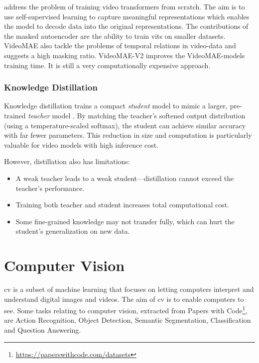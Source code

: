 \textcite{tong_videomae_2022} address the problem of training video transformers from scratch. The aim is to use self-supervised learning to capture meaningful representations which enables the model to decode data into the original representations. The contributions of the masked autoencoder \cite{tong_videomae_2022} are the ability to train \acrshort{vit}s on smaller datasets. VideoMAE \cite{tong_videomae_2022} also tackle the problems of temporal relations in video-data and suggests a high masking ratio. VideoMAE-V2 \cite{wang_videomae_2023} improves the VideoMAE-models training time. It is still a very computationally expensive approach. 


\subsubsection{Knowledge Distillation}
\label{sssec:knowledge_distillation}

Knowledge distillation trains a compact \emph{student} model to mimic a larger, pre-trained \emph{teacher} model \cite{denize_comedian_2024, li_videomamba_2024, bose_soccerkdnet_2023}. By matching the teacher's softened output distribution (using a temperature-scaled softmax), the student can achieve similar accuracy with far fewer parameters. This reduction in size and computation is particularly valuable for video models with high inference cost.

However, distillation also has limitations:
\begin{itemize}
    \item A weak teacher leads to a weak student—distillation cannot exceed the teacher's performance.
    \item Training both teacher and student increases total computational cost.
    \item Some fine-grained knowledge may not transfer fully, which can hurt the student's generalization on new data.
\end{itemize}


\section{Computer Vision} 
\label{sec:computer_vision}

\acrfull{cv} is a subset of machine learning that focuses on letting computers interpret and understand digital images and videos. The aim of \acrlong{cv} is to enable computers to see. Some tasks relating to computer vision, extracted from Papers with Code\footnote{\url{https://paperswithcode.com/datasets}}, are Action Recognition, Object Detection, Semantic Segmentation, Classification and Question Answering. 

